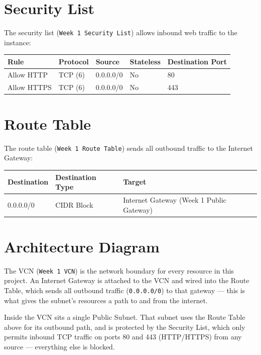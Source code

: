 \documentclass[11pt,a4paper]{article}
\begin{document}
\section{Security List}

The security list (\texttt{Week 1 Security List}) allows inbound web traffic to the instance:

\begin{table}[h!]
\centering
\begin{tabular}{|l|l|l|l|l|}
\hline
\rowcolor{lightblue}
\textbf{Rule} & \textbf{Protocol} & \textbf{Source} & \textbf{Stateless} & \textbf{Destination Port} \\
\hline
Allow HTTP  & TCP (6) & 0.0.0.0/0 & No & 80 \\
\hline
Allow HTTPS & TCP (6) & 0.0.0.0/0 & No & 443 \\
\hline
\end{tabular}
\end{table}

\section{Route Table}

The route table (\texttt{Week 1 Route Table}) sends all outbound traffic to the Internet Gateway:

\begin{table}[h!]
\centering
\begin{tabular}{|l|l|l|}
\hline
\rowcolor{lightblue}
\textbf{Destination} & \textbf{Destination Type} & \textbf{Target} \\
\hline
0.0.0.0/0 & CIDR Block & Internet Gateway (Week 1 Public Gateway) \\
\hline
\end{tabular}
\end{table}

\section{Architecture Diagram}

The VCN (\texttt{Week 1 VCN}) is the network boundary for every resource in this project. An Internet Gateway is attached to the VCN and wired into the Route Table, which sends all outbound traffic (\texttt{0.0.0.0/0}) to that gateway --- this is what gives the subnet's resources a path to and from the internet.

Inside the VCN sits a single Public Subnet. That subnet uses the Route Table above for its outbound path, and is protected by the Security List, which only permits inbound TCP traffic on ports 80 and 443 (HTTP/HTTPS) from any source --- everything else is blocked.
\end{document}

